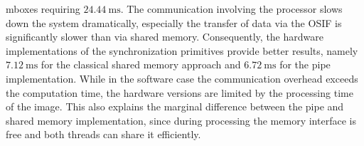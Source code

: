 mboxes requiring $\SI{24.44}{\milli\second}$. The communication involving the
processor slows down the system dramatically, especially the transfer of data
via the \ac{OSIF} is significantly slower than via shared memory.
Consequently, the hardware implementations of the synchronization primitives
provide better results, namely $\SI{7.12}{\milli\second}$ for the classical
shared memory approach and $\SI{6.72}{\milli\second}$ for the pipe
implementation. While in the software case the communication overhead exceeds
the computation time, the hardware versions are limited by the processing time
of the image. This also explains the marginal difference between the pipe and
shared memory implementation, since during processing the memory interface is
free and both threads can share it efficiently.


